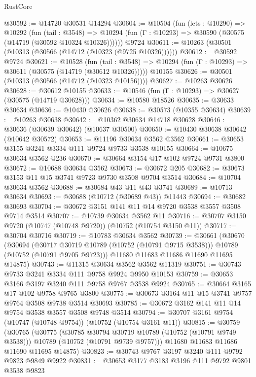 \begin{lexlean}{RustCore}
\begin{coremodule}
@30592 := @14720 @30531 @14294
@30604 := @10504
    (fun (lets : @10290) =>
    @10292
      (fun (tail : @3548) =>
      @10294 (fun (Γ : @10293) => @30590 (@30575 (@14719 (@30592 @10324 @10326))))))
    @9724
@30611 := @10263 (@30501 (@10313 (@30566 (@14712 (@10323 (@9725 @10326))))))
@30612 := @30592 @9724
@30621 := @10528
    (fun (tail : @3548) => @10294 (fun (Γ : @10293) => @30611 (@30575 (@14719 (@30612 @10326)))))
    @10155
@30626 := @30501 (@10313 (@30566 (@14712 (@10323 @10156))))
@30627 := @10263 @30626
@30628 := @30612 @10155
@30633 := @10546 (fun (Γ : @10293) => @30627 (@30575 (@14719 @30628)))
@30634 := @10580 @18526
@30635 := @30633 @30634
@30636 := @10430 @30626
@30638 := @30573 (@10355 @30634)
@30639 := @10263 @30638
@30642 := @10362 @30634 @14718 @30628
@30646 := @30636 (@30639 @30642) (@10637 @30500)
@30650 := @10430 @30638 @30642 (@10642 @30572)
@30653 := @11196 @30634 @3562 @3562
@30661 := @30653 @3155 @3241 @3334 @111 @9724 @9733 @3538 @10155
@30664 := @10675 @30634 @3562 @236
@30670 := @30664 @3154 @17 @102 @9724 @9731 @3800
@30672 := @10688 @30634 @3562
@30673 := @30672 @205
@30682 := @30673 @3153 @11 @15 @3741 @9723 @9730 @3508 @9704 @3514
@30684 := @10704 @30634 @3562
@30688 := @30684 @43 @11 @43 @3741
@30689 := @10713 @30634
@30693 := @30688 (@10712 (@30689 @43)) @11443
@30694 := @30682 @30693
@30704 := @30672 @3151 @141 @11 @14 @9720 @3538 @3557 @3508 @9714 @3514
@30707 := @10739 @30634 @3562 @11
@30716 := @30707 @3150 @9720 (@10747 (@10748 @9720)) (@10752 (@10754 @3150 @11))
@30717 := @30704 @30716
@30719 := @10783 @30634 @3562
@30739 := @30661
    (@30670
      (@30694
        (@30717 @30719 @10789 (@10752 (@10791 @9715 @3538)))
        @10789
        (@10752 (@10791 @9705 @9723)))
      @11680
      @11683
      @11686
      @11690
      @11695
      @14875)
@30743 := @11315 @30634 @3562 @3562 @11319
@30751 := @30743 @9733 @3241 @3334 @111 @9758 @9924 @9950 @10153
@30759 := @30653 @3166 @3197 @3240 @111 @9758 @9767 @3538 @9924
@30765 := @30664 @3165 @17 @102 @9758 @9765 @3800
@30775 := @30673 @3164 @11 @15 @3741 @9757 @9764 @3508 @9738 @3514 @30693
@30785 := @30672 @3162 @141 @11 @14 @9754 @3538 @3557 @3508 @9748 @3514
@30794 := @30707 @3161 @9754 (@10747 (@10748 @9754)) (@10752 (@10754 @3161 @11))
@30815 := @30759
    (@30765
      (@30775
        (@30785 @30794 @30719 @10789 (@10752 (@10791 @9749 @3538)))
        @10789
        (@10752 (@10791 @9739 @9757)))
      @11680
      @11683
      @11686
      @11690
      @11695
      @14875)
@30823 := @30743 @9767 @3197 @3240 @111 @9792 @9823 @9849 @9922
@30831 := @30653 @3177 @3183 @3196 @111 @9792 @9801 @3538 @9823

\end{coremodule}
\end{lexlean}
